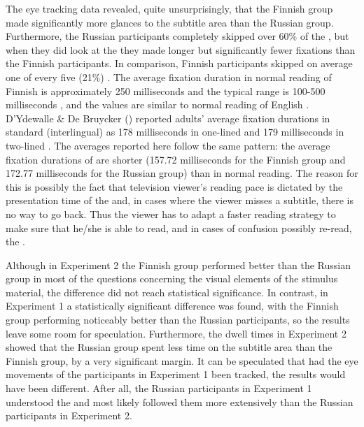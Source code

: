 \documentclass[output=paper]{langsci/langscibook}
\begin{document}
The eye tracking data revealed, quite unsurprisingly, that the Finnish group made significantly more glances to the subtitle area than the Russian group. Furthermore, the Russian participants completely skipped over 60\% of the , but when they did look at the  they made longer but significantly fewer fixations than the Finnish participants. In comparison, Finnish participants skipped on average one of every five (21\%) . The average fixation duration in normal reading of Finnish is approximately 250 milliseconds and the typical range is 100-500 milliseconds \citep{hyona1996}, and the values are similar to normal reading of English \citep{Rayner1998}. D'Ydewalle \& De Bruycker (\citeyear*{Bruycker2007}) reported adults' average fixation durations in standard (interlingual)  as 178 milliseconds in one-lined  and 179 milliseconds in two-lined . The averages reported here follow the same pattern: the average fixation durations of  are shorter (157.72 milliseconds for the Finnish group and 172.77 milliseconds for the Russian group) than in normal reading. The reason for this is possibly the fact that television viewer's reading pace is dictated by the presentation time of the  and, in cases where the viewer misses a subtitle, there is no way to go back. Thus the viewer has to adapt a faster reading strategy to make sure that he/she is able to read, and in cases of confusion possibly re-read, the . 

Although in Experiment 2 the Finnish group performed better than the Russian group in most of the questions concerning the visual elements of the stimulus material, the difference did not reach statistical significance. In contrast, in Experiment 1 a statistically significant difference was found, with the Finnish group performing noticeably better than the Russian participants, so the results leave some room for speculation. Furthermore, the dwell times in Experiment 2 showed that the Russian group spent less time on the subtitle area than the Finnish group, by a very significant margin. It can be speculated that had the eye movements of the participants in Experiment 1 been tracked, the results would have been different. After all, the Russian participants in Experiment 1 understood the  and most likely followed them more extensively than the Russian participants in Experiment 2.
\end{document}
